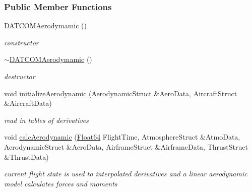 \subsubsection*{Public Member Functions}
\begin{DoxyCompactItemize}
\item 
\mbox{\label{group___aerodynamic_a03d01a72cf389483e03e2bf6cce33299}} 
\hyperlink{group___aerodynamic_a03d01a72cf389483e03e2bf6cce33299}{D\+A\+T\+C\+O\+M\+Aerodymamic} ()
\begin{DoxyCompactList}\small\item\em constructor \end{DoxyCompactList}\item 
\mbox{\label{group___aerodynamic_a3619e38867cad4b0c8b06a939281a74e}} 
\hyperlink{group___aerodynamic_a3619e38867cad4b0c8b06a939281a74e}{$\sim$\+D\+A\+T\+C\+O\+M\+Aerodymamic} ()
\begin{DoxyCompactList}\small\item\em destructor \end{DoxyCompactList}\item 
\mbox{\label{group___aerodynamic_ae739c87d390f0ae0a293985478ff5d72}} 
void \hyperlink{group___aerodynamic_ae739c87d390f0ae0a293985478ff5d72}{initialize\+Aerodynamic} (Aerodynamic\+Struct \&Aero\+Data, Aircraft\+Struct \&Aircraft\+Data)
\begin{DoxyCompactList}\small\item\em read in tables of derivatives \end{DoxyCompactList}\item 
\mbox{\label{group___aerodynamic_a2c31940a25ec9396657d701ef3004327}} 
void \hyperlink{group___aerodynamic_a2c31940a25ec9396657d701ef3004327}{calc\+Aerodynamic} (\hyperlink{group___tools_ga3f1431cb9f76da10f59246d1d743dc2c}{Float64} Flight\+Time, Atmosphere\+Struct \&Atmo\+Data, Aerodynamic\+Struct \&Aero\+Data, Airframe\+Struct \&Airframe\+Data, Thrust\+Struct \&Thrust\+Data)
\begin{DoxyCompactList}\small\item\em current flight state is used to interpolated derivatives and a linear aerodynamic model calculates forces and moments \end{DoxyCompactList}\end{DoxyCompactItemize}
